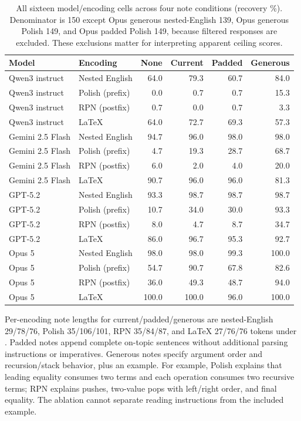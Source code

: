 \documentclass{article}
\newcommand{\code}[1]{\texttt{\detokenize{#1}}}
\newcommand{\pct}{\%}
\begin{document}
\begin{table}[h]
\centering
\small
\caption{All sixteen model/encoding cells across four note conditions (recovery
\pct). Denominator is 150 except Opus generous nested-English 139, Opus generous
Polish 149, and Opus padded Polish 149, because filtered responses are excluded.
These exclusions matter for interpreting apparent ceiling scores.}
\begin{tabular}{llrrrr}
\toprule
Model & Encoding & None & Current & Padded & Generous \\
\midrule
Qwen3 instruct & Nested English & 64.0 & 79.3 & 60.7 & 84.0 \\
Qwen3 instruct & Polish (prefix) & 0.0 & 0.7 & 0.7 & 15.3 \\
Qwen3 instruct & RPN (postfix) & 0.7 & 0.0 & 0.7 & 3.3 \\
Qwen3 instruct & LaTeX & 64.0 & 72.7 & 69.3 & 57.3 \\
Gemini 2.5 Flash & Nested English & 94.7 & 96.0 & 98.0 & 98.0 \\
Gemini 2.5 Flash & Polish (prefix) & 4.7 & 19.3 & 28.7 & 68.7 \\
Gemini 2.5 Flash & RPN (postfix) & 6.0 & 2.0 & 4.0 & 20.0 \\
Gemini 2.5 Flash & LaTeX & 90.7 & 96.0 & 96.0 & 81.3 \\
GPT-5.2 & Nested English & 93.3 & 98.7 & 98.7 & 98.7 \\
GPT-5.2 & Polish (prefix) & 10.7 & 34.0 & 30.0 & 93.3 \\
GPT-5.2 & RPN (postfix) & 8.0 & 4.7 & 8.7 & 34.7 \\
GPT-5.2 & LaTeX & 86.0 & 96.7 & 95.3 & 92.7 \\
Opus 5 & Nested English & 98.0 & 98.0 & 99.3 & 100.0 \\
Opus 5 & Polish (prefix) & 54.7 & 90.7 & 67.8 & 82.6 \\
Opus 5 & RPN (postfix) & 36.0 & 49.3 & 48.7 & 94.0 \\
Opus 5 & LaTeX & 100.0 & 100.0 & 96.0 & 100.0 \\
\bottomrule
\end{tabular}
\end{table}

Per-encoding note lengths for current/padded/generous are nested-English
29/78/76, Polish 35/106/101, RPN 35/84/87, and LaTeX 27/76/76 tokens under
\code{cl100k_base}. Padded notes append complete on-topic sentences without
additional parsing instructions or imperatives. Generous notes specify argument
order and recursion/stack behavior, plus an example. For example, Polish
explains that leading equality consumes two terms and each operation consumes
two recursive terms; RPN explains pushes, two-value pops with left/right order,
and final equality. The ablation cannot separate reading instructions from
the included example.
\end{document}

